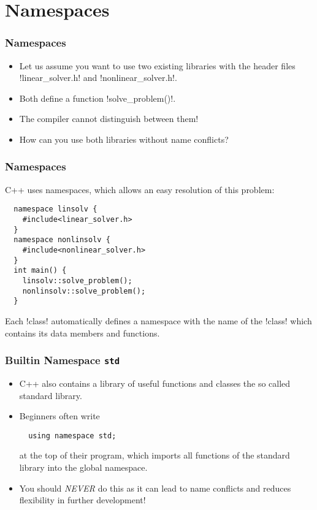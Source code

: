 \section{Namespaces}

\begin{frame}[fragile]
  \frametitle<presentation>{Namespaces}
  \begin{itemize}
  \item Let us assume you want to use two existing libraries with the header files \inline!linear_solver.h! and \inline!nonlinear_solver.h!. 
  \item Both define a function \inline!solve_problem()!. 
  \item The compiler cannot distinguish between them!
  \item How can you use both libraries without name conflicts? 
  \end{itemize}
  
\end{frame}

\begin{frame}[fragile]
  \frametitle<presentation> {Namespaces}
  C++ uses namespaces, which allows an easy resolution of this problem:
\begin{lstlisting}
  namespace linsolv {
    #include<linear_solver.h>
  }
  namespace nonlinsolv {
    #include<nonlinear_solver.h>
  }
  int main() {
    linsolv::solve_problem();
    nonlinsolv::solve_problem();
  }
\end{lstlisting}
Each \inline!class! automatically defines a namespace with the name of the \inline!class! which contains its data members and functions.
\end{frame}

\begin{frame}[fragile]
  \frametitle{Builtin Namespace \texttt{std}}
  \begin{itemize}
  \item C++ also contains a library of useful functions and classes the so called standard library. 
  \item Beginners often write 
  \begin{lstlisting}
  using namespace std;
  \end{lstlisting}
at the top of their program, which imports all functions of the standard library into the global namespace.
  \item You should \emph{NEVER} do this as it can lead to name conflicts and reduces flexibility in further development!
  \end{itemize}
  
\end{frame}

